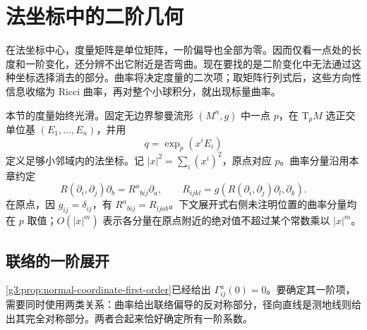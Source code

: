
% 
% 

\section{法坐标中的二阶几何}
\label{g3:sec:0303}

在法坐标中心，度量矩阵是单位矩阵，一阶偏导也全部为零。因而仅看一点处的长度和一阶变化，还分辨不出它附近是否弯曲。现在要找的是二阶变化中无法通过这种坐标选择消去的部分。曲率将决定度量的二次项；取矩阵行列式后，这些方向性信息收缩为 Ricci 曲率，再对整个小球积分，就出现标量曲率。

\ProseParagraphBreak

本节的度量始终光滑。固定无边界黎曼流形 \((M^n,g)\) 中一点 \(p\)，在 \(\mathrm T_pM\) 选正交单位基 \((E_1,\ldots,E_n)\)，并用
\[
	q=\exp_p(x^iE_i)
\]
定义足够小邻域内的法坐标。记 \(|x|^2=\sum_i(x^i)^2\)，原点对应 \(p\)。曲率分量沿用本章约定
\[
	R(\partial_i,\partial_j)\partial_b
	=R^a{}_{b i j}\partial_a,\qquad
	R_{ijkl}=g(R(\partial_i,\partial_j)\partial_l,\partial_k).
\]
在原点，因 \(g_{ij}=\delta_{ij}\)，有 \(R^a{}_{b i j}=R_{ijab}\)。下文展开式右侧未注明位置的曲率分量均在 \(p\) 取值；\(O(|x|^m)\) 表示各分量在原点附近的绝对值不超过某个常数乘以 \(|x|^m\)。

\subsection{联络的一阶展开}
\label{g3:subsec:0303:01}

\cref{g3:prop:normal-coordinate-first-order}已经给出 \(\Gamma^a_{ij}(0)=0\)。要确定其一阶项，需要同时使用两类关系：曲率给出联络偏导的反对称部分，径向直线是测地线则给出其完全对称部分。两者合起来恰好确定所有一阶系数。

